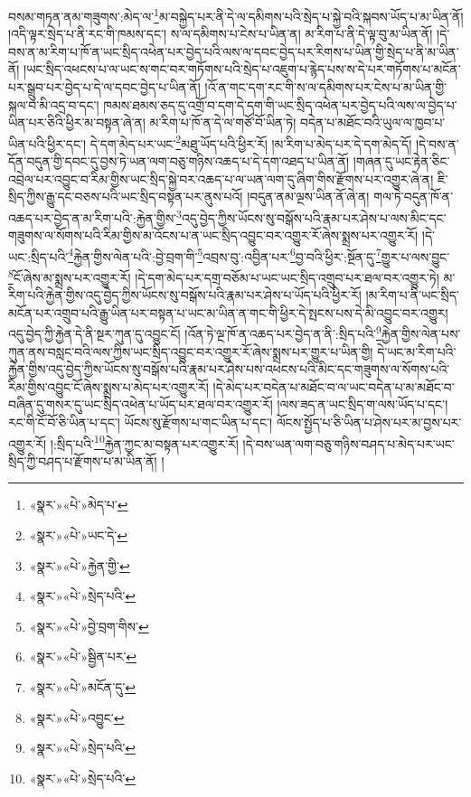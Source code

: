 བསམ་གཏན་ནམ་གཟུགས་:མེད་ལ་\footnote{«སྣར་»«པེ་»མེད་པ་}མ་བསྐྱེད་པར་ནི་དེ་ལ་དམིགས་པའི་སྲེད་པ་སྐྱེ་བའི་སྐབས་ཡོད་པ་མ་ཡིན་ནོ། །འདི་ལྟར་སྲེད་པ་ནི་རང་གི་ཁམས་དང་། ས་ལ་དམིགས་པ་ངེས་པ་ཡིན་ན། མ་རིག་པ་ནི་དེ་ལྟ་བུ་མ་ཡིན་ནོ། །དེ་བས་ན་མ་རིག་པ་ཁོ་ན་ཡང་སྲིད་འཕེན་པར་བྱེད་པའི་ལས་ལ་དབང་བྱེད་པར་རིགས་པ་ཡིན་གྱི་སྲེད་པ་ནི་མ་ཡིན་ནོ། །ཡང་སྲིད་འཕངས་པ་ལ་ཡང་ས་གང་བར་གཏོགས་པའི་སྲེད་པ་འཇུག་པ་རྙེད་པས་ས་དེ་པར་གཏོགས་པ་མངོན་པར་སྒྲུབ་པར་བྱེད་པ་དེ་ལ་དབང་བྱེད་པ་ཡིན་ནོ། །འོ་ན་གང་དག་རང་གི་ས་ལ་དམིགས་པར་ངེས་པ་མ་ཡིན་གྱི་སྐལ་བ་མི་འདྲ་བ་དང་། ཁམས་ཐམས་ཅད་དུ་འགྲོ་བ་དག་དེ་དག་གི་ཡང་སྲིད་འཕེན་པར་བྱེད་པའི་ལས་ལ་བྱེད་པ་ཡིན་པར་ཅིའི་ཕྱིར་མ་བསྟན་ཞེ་ན། མ་རིག་པ་ཁོ་ན་དེ་ལ་གཙོ་བོ་ཡིན་ཏེ། བདེན་པ་མཐོང་བའི་ཡུལ་ལ་ཁྱབ་པ་ཡིན་པའི་ཕྱིར་དང་། དེ་དག་མེད་པར་ཡང་\footnote{«སྣར་»«པེ་»ཡང་དེ་}མཐུ་ཡོད་པའི་ཕྱིར་རོ། །མ་རིག་པ་མེད་པར་དེ་དག་མེད་དོ། །དེ་བས་ན་དོན་བདུན་གྱི་དབང་དུ་བྱས་ཏེ་ཡན་ལག་བཅུ་གཉིས་འཆད་པ་དེ་དག་འཐད་པ་ཡིན་ནོ། །གཞན་དུ་ཡང་རྟེན་ཅིང་འབྲེལ་པར་འབྱུང་བ་རིམ་གྱིས་ཡང་སྲིད་སྐྱེ་བར་འཆད་པ་ལ་ཡན་ལག་དུ་ཞིག་གིས་རྫོགས་པར་འགྱུར་ཞེ་ན། ཇི་སྲིད་ཀྱིས་རྒྱུ་དང་བཅས་པའི་ཡང་སྲིད་བསྟན་པར་ནུས་པའོ། །བདུན་ནམ་ལྔས་ཡིན་ནོ་ཞེ་ན། གལ་ཏེ་བདུན་ཁོ་ན་འཆད་པར་བྱེད་ན་མ་རིག་པའི་:རྐྱེན་གྱིས་\footnote{«སྣར་»«པེ་»རྐྱེན་གྱི་}འདུ་བྱེད་ཀྱིས་ཡོངས་སུ་བསྒོས་པའི་རྣམ་པར་ཤེས་པ་ལས་མིང་དང་གཟུགས་ལ་སོགས་པའི་རིམ་གྱིས་མ་འོངས་པ་ན་ཡང་སྲིད་འབྱུང་བར་འགྱུར་རོ་ཞེས་སྨྲས་པར་འགྱུར་རོ། །དེ་ཡང་:སྲིད་པའི་\footnote{«སྣར་»«པེ་»སྲེད་པའི་}རྐྱེན་གྱིས་ལེན་པའི་:བྱེ་བྲག་གི་\footnote{«སྣར་»«པེ་»བྱེ་བྲག་གིས་}འབྲས་བུ་:འབྱིན་པར་\footnote{«སྣར་»«པེ་»སྦྱིན་པར་}བྱ་བའི་ཕྱིར་:སྔོན་དུ་\footnote{«སྣར་»«པེ་»མངོན་དུ་}གྱུར་པ་ལས་བྱུང་\footnote{«སྣར་»«པེ་»འབྱུང་}ངོ་ཞེས་མ་སྨྲས་པར་འགྱུར་རོ། །དེ་དག་མེད་པར་དགྲ་བཅོམ་པ་ཡང་ཡང་སྲིད་འགྲུབ་པར་ཐལ་བར་འགྱུར་ཏེ། མ་རིག་པའི་རྐྱེན་གྱིས་འདུ་བྱེད་ཀྱིས་ཡོངས་སུ་བསྒོས་པའི་རྣམ་པར་ཤེས་པ་ཡོད་པའི་ཕྱིར་རོ། །མ་རིག་པ་ནི་ཡང་སྲིད་མངོན་པར་འགྲུབ་པའི་རྒྱུ་ཡིན་པར་བསྟན་པ་ཡང་མ་ཡིན་ན་གང་གི་ཕྱིར་དེ་སྤངས་པས་དེ་མི་འབྱུང་བར་འགྱུར། འདུ་བྱེད་ཀྱི་རྐྱེན་དེ་ནི་སྔར་ཀུན་དུ་འབྱུང་ངོ། །འོན་ཏེ་ལྔ་ཁོ་ན་འཆད་པར་བྱེད་ན་ནི་:སྲིད་པའི་\footnote{«སྣར་»«པེ་»སྲེད་པའི་}རྐྱེན་གྱིས་ལེན་པས་ཀུན་ནས་བསླང་བའི་ལས་ཀྱིས་ཡང་སྲིད་འབྱུང་བར་འགྱུར་རོ་ཞེས་སྨྲས་པར་གྱུར་པ་ཡིན་གྱི། དེ་ཡང་མ་རིག་པའི་རྐྱེན་གྱིས་འདུ་བྱེད་ཀྱིས་ཡོངས་སུ་བསྒོས་པའི་རྣམ་པར་ཤེས་པས་འཕངས་པའི་མིང་དང་གཟུགས་ལ་སོགས་པའི་རིམ་གྱིས་འབྱུང་ངོ་ཞེས་སྨྲས་པ་མེད་པར་འགྱུར་རོ། །དེ་མེད་པར་བདེན་པ་མཐོང་བ་ལ་ཡང་བདེན་པ་མ་མཐོང་བ་བཞིན་དུ་གསར་དུ་ཡང་སྲིད་འཕེན་པ་ཡོད་པར་ཐལ་བར་འགྱུར་རོ། །ལས་ཟད་ན་ཡང་སྲིད་ག་ལས་ཡོད་པ་དང་། རང་གི་ངོ་བོ་ཅི་ཡིན་པ་དང་། ཡོངས་སུ་རྫོགས་པ་གང་ཡིན་པ་དང་། ལོངས་སྤྱོད་པ་ཅི་ཡིན་པ་ཤེས་པར་མ་བྱས་པར་འགྱུར་རོ། །:སྲིད་པའི་\footnote{«སྣར་»«པེ་»སྲེད་པའི་}རྐྱེན་ཀྱང་མ་བསྟན་པར་འགྱུར་རོ། །དེ་བས་ཡན་ལག་བཅུ་གཉིས་བཤད་པ་མེད་པར་ཡང་སྲིད་ཀྱི་བཤད་པ་རྫོགས་པ་མ་ཡིན་ནོ། །
